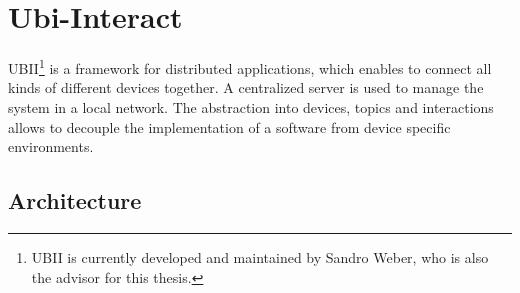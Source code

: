 \section{Ubi-Interact}\label{section:ubi-interact}
\setcounter{footnote}{0} %

\ac{UBII}\footnote{UBII is currently developed and maintained by Sandro Weber, who is also the advisor for this thesis.} is a framework for distributed applications, which enables to connect all kinds of different devices together. A centralized server is used to manage the system in a local network. The abstraction into devices, topics and interactions allows to decouple the implementation of a software from device specific environments.


\subsection{Architecture}\label{subsection:architecture}

